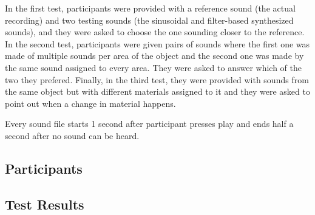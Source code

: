 In the first test, participants were provided with a reference sound (the actual recording) and two testing sounds (the sinusoidal and filter-based synthesized sounds), and they were asked to choose the one sounding closer to the reference. In the second test, participants were given pairs of sounds where the first one was made of multiple sounds per area of the object and the second one was made by the same sound assigned to every area. They were asked to answer which of the two they prefered. Finally, in the third test, they were provided with sounds from the same object but with different materials assigned to it and they were asked to point out when a change in material happens. 

Every sound file starts 1 second after participant presses play and ends half a second after no sound can be heard.

\subsection{Participants}

\subsection{Test Results}